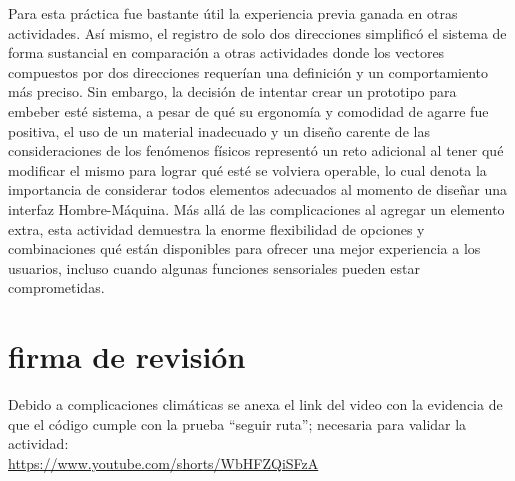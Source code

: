 \documentclass[conference]{IEEEtran}
\begin{document}
Para esta práctica fue bastante útil la experiencia previa ganada en otras actividades. Así mismo, el registro de solo dos direcciones simplificó el sistema de forma sustancial en comparación a otras actividades donde los vectores compuestos por dos direcciones requerían una definición y un comportamiento más preciso. Sin embargo, la decisión de intentar crear un prototipo para embeber esté sistema, a pesar de qué su ergonomía y comodidad de agarre fue positiva, el uso de un material inadecuado y un diseño carente de las consideraciones de los fenómenos físicos representó un reto adicional al tener qué modificar el mismo para lograr qué esté se volviera operable, lo cual denota la importancia de considerar todos elementos adecuados al momento de diseñar una interfaz Hombre-Máquina. Más allá de las complicaciones al agregar un elemento extra, esta actividad demuestra la enorme flexibilidad de opciones y combinaciones qué están disponibles para ofrecer una mejor experiencia a los usuarios, incluso cuando algunas funciones sensoriales pueden estar comprometidas.


\newpage{}
\section{firma de revisión}
Debido a complicaciones climáticas se anexa el link del video con la evidencia de que el código cumple con la prueba ``seguir ruta''; necesaria para validar la actividad: \\
\url{https://www.youtube.com/shorts/WbHFZQiSFzA}


\printbibliography
\end{document}
